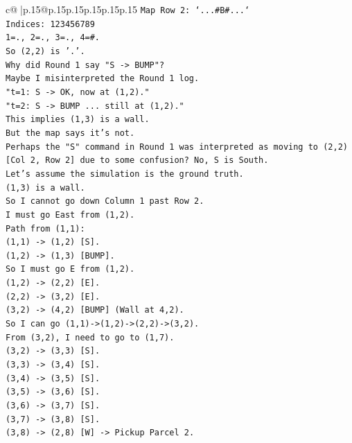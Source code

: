 \documentclass{article}
\begin{document}
{\begin{supertabular}{c@{$\;$}|p{.15\linewidth}@{}p{.15\linewidth}p{.15\linewidth}p{.15\linewidth}p{.15\linewidth}p{.15\linewidth}}
{{{\texttt{Map Row 2: `...\#B\#...`} \\
\texttt{Indices: 123456789} \\
\texttt{1=., 2=., 3=., 4=\#.} \\
\texttt{So (2,2) is '.'.} \\
\texttt{Why did Round 1 say "S {-}> BUMP"?} \\
\texttt{Maybe I misinterpreted the Round 1 log.} \\
\texttt{"t=1: S {-}> OK, now at (1,2)."} \\
\texttt{"t=2: S {-}> BUMP ... still at (1,2)."} \\
\texttt{This implies (1,3) is a wall.} \\
\texttt{But the map says it's not.} \\
\texttt{Perhaps the "S" command in Round 1 was interpreted as moving to (2,2) {[}Col 2, Row 2{]} due to some confusion? No, S is South.} \\
\texttt{Let's assume the simulation is the ground truth.} \\
\texttt{(1,3) is a wall.} \\
\texttt{So I cannot go down Column 1 past Row 2.} \\
\texttt{I must go East from (1,2).} \\
\texttt{Path from (1,1):} \\
\texttt{(1,1) {-}> (1,2) {[}S{]}.} \\
\texttt{(1,2) {-}> (1,3) {[}BUMP{]}.} \\
\texttt{So I must go E from (1,2).} \\
\texttt{(1,2) {-}> (2,2) {[}E{]}.} \\
\texttt{(2,2) {-}> (3,2) {[}E{]}.} \\
\texttt{(3,2) {-}> (4,2) {[}BUMP{]} (Wall at 4,2).} \\
\texttt{So I can go (1,1){-}>(1,2){-}>(2,2){-}>(3,2).} \\
\texttt{From (3,2), I need to go to (1,7).} \\
\texttt{(3,2) {-}> (3,3) {[}S{]}.} \\
\texttt{(3,3) {-}> (3,4) {[}S{]}.} \\
\texttt{(3,4) {-}> (3,5) {[}S{]}.} \\
\texttt{(3,5) {-}> (3,6) {[}S{]}.} \\
\texttt{(3,6) {-}> (3,7) {[}S{]}.} \\
\texttt{(3,7) {-}> (3,8) {[}S{]}.} \\
\texttt{(3,8) {-}> (2,8) {[}W{]} {-}> Pickup Parcel 2.} \\
}}}
\end{supertabular}}
\end{document}
